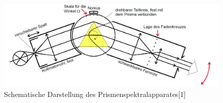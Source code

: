 	\begin{figure}[h]
		\begin{center}
		\includegraphics[scale=0.3]{picapparatur.jpg}
		\caption{Schematische Darstellung des Prismenspektralapparates[1]}
		\label{picapparatur}
		\end{center}	
	\end{figure}